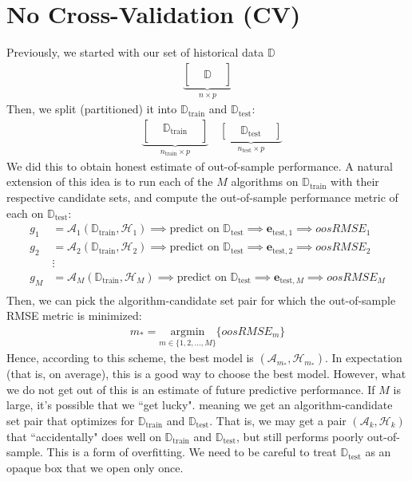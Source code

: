 \documentclass[12pt, a4paper]{article}
\theoremstyle{definition}
\newcommand{\test}{\text{test}}
\newcommand{\train}{\text{train}}
\newcommand{\Dtest}{\mathbb{D}_{\test}}
\newcommand{\Dtrain}{\mathbb{D}_{\train}}
\begin{document}
	\section*{No Cross-Validation (CV)}
	Previously, we started with our set of historical data $\mathbb{D}$
	\begin{align*}
		\underbrace{
		\begin{bmatrix}
			{} & {} & {}\\
			{} & \mathbb{D} & {}\\
			{} & {} & {}
		\end{bmatrix}
		}_{n\times p}
	\end{align*}
	Then, we split (partitioned) it into $\mathbb{D}_{\text{train}}$ and $\mathbb{D}_{\text{test}}$:
	\begin{align*}
		&\underbrace{
		\begin{bmatrix}
			{} & \mathbb{D}_{\text{train}} & {}\\
			{} & {} & {}
		\end{bmatrix}
		}_{n_{\text{train}}\times p}\quad
		\underbrace{
		\begin{bmatrix}
			{} & \mathbb{D}_{\text{test}} & {}
		\end{bmatrix}
		}_{n_{\text{test}}\times p}
	\end{align*}
	We did this to obtain honest estimate of out-of-sample performance.
	A natural extension of this idea is to run each of the $M$ algorithms on $\Dtrain$
	with their respective candidate sets, and compute the out-of-sample performance metric of
	each on $\Dtest$:
	\begin{align*}
		g_1&=\mathcal{A}_1(\mathbb{D}_{\text{train}}, \mathcal{H}_{1})\implies
		\text{predict on }\Dtest\implies
		\bm{e}_{\test,1}\implies oosRMSE_1\\
		g_2&=\mathcal{A}_2(\mathbb{D}_{\text{train}}, \mathcal{H}_{2})\implies
		\text{predict on }\Dtest\implies
		\bm{e}_{\test,2}\implies oosRMSE_2\\
		&\vdots\\
		g_M&=\mathcal{A}_M(\mathbb{D}_{\text{train}}, \mathcal{H}_{M})\implies
		\text{predict on }\Dtest\implies
		\bm{e}_{\test,M}\implies oosRMSE_M\\
	\end{align*}
	Then, we can pick the algorithm-candidate set pair for which the out-of-sample
	RMSE metric is minimized:
	\begin{align*}
		m_* = \underset{m\in \{1,2,\ldots,M\}}{\text{argmin}}\{oosRMSE_m\}
	\end{align*}
	Hence, according to this scheme, the best model is $(\mathcal{A}_{m_*}, \mathcal{H}_{m_*})$.
	In expectation (that is, on average), this is a good way to choose the best
	model. However, what we do not get out of this is an estimate of future
	predictive performance. If $M$ is large, it's possible that we ``get lucky".
	meaning we get an algorithm-candidate set pair that optimizes for $\Dtrain$ and $\Dtest$.
	That is, we may get a pair $(\mathcal{A}_k, \mathcal{H}_k)$ that ``accidentally"
	does well on $\Dtrain$ and $\Dtest$, but still performs poorly out-of-sample.
	This is a form of overfitting. We need to be careful to treat $\Dtest$ as an
	opaque box that we open only once.
	
\end{document}
